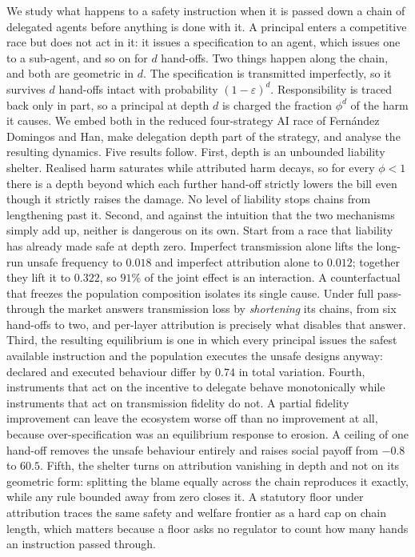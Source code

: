 \noindent
We study what happens to a safety instruction when it is passed down a chain of
delegated agents before anything is done with it. A principal enters a
competitive race but does not act in it: it issues a specification to an agent,
which issues one to a sub-agent, and so on for $d$ hand-offs. Two things happen
along the chain, and both are geometric in $d$. The specification is
transmitted imperfectly, so it survives $d$ hand-offs intact with probability
$(1-\varepsilon)^{d}$. Responsibility is traced back only in part, so a
principal at depth $d$ is charged the fraction $\phi^{d}$ of the harm it causes.
We embed both in the reduced four-strategy AI race of Fern\'andez Domingos and
Han, make delegation depth part of the strategy, and analyse the resulting
dynamics. Five results follow. First, depth is an unbounded liability shelter.
Realised harm saturates while attributed harm decays, so for every $\phi<1$
there is a depth beyond which each further hand-off strictly lowers the bill
even though it strictly raises the damage. No level of liability stops chains
from lengthening past it. Second, and against the intuition that the two
mechanisms simply add up, neither is dangerous on its own. Start from a race
that liability has already made safe at depth zero. Imperfect transmission alone
lifts the long-run unsafe frequency to $0.018$ and imperfect attribution alone
to $0.012$; together they lift it to $0.322$, so $91\%$ of the joint effect is
an interaction. A counterfactual that freezes the population composition
isolates its single cause. Under full pass-through the market answers
transmission loss by \emph{shortening} its chains, from six hand-offs to two,
and per-layer attribution is precisely what disables that answer. Third, the
resulting equilibrium is one in which every principal issues the safest
available instruction and the population executes the unsafe designs anyway:
declared and executed behaviour differ by $0.74$ in total variation. Fourth,
instruments that act on the incentive to delegate behave monotonically while
instruments that act on transmission fidelity do not. A partial fidelity
improvement can leave the ecosystem worse off than no improvement at all,
because over-specification was an equilibrium response to erosion. A ceiling of
one hand-off removes the unsafe behaviour entirely and raises social payoff from
$-0.8$ to $60.5$. Fifth, the shelter turns on attribution vanishing in depth
and not on its geometric form: splitting the blame equally across the chain
reproduces it exactly, while any rule bounded away from zero closes it. A
statutory floor under attribution traces the same safety and welfare frontier
as a hard cap on chain length, which matters because a floor asks no regulator
to count how many hands an instruction passed through.

